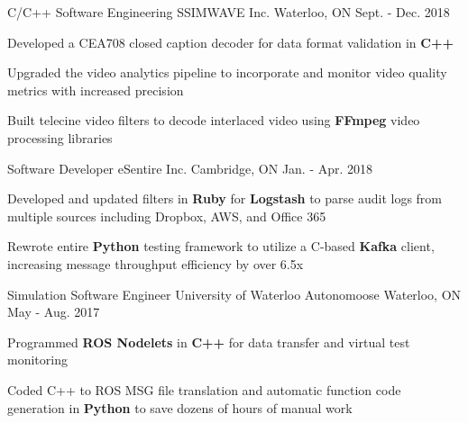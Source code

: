 \begin{cventries}

\cventry
{C/C++ Software Engineering} %
{SSIMWAVE Inc.} %
{Waterloo, ON} %
{Sept. - Dec. 2018} %
{ %
\begin{cvitems}
\item {Developed a CEA708 closed caption decoder for data format validation in {\bf C++}}
\item {Upgraded the video analytics pipeline to incorporate and monitor video quality metrics with increased precision}
\item {Built telecine video filters to decode interlaced video using {\bf FFmpeg} video processing libraries}
\end{cvitems}
}


\cventry
{Software Developer} %
{eSentire Inc.} %
{Cambridge, ON} %
{Jan. - Apr. 2018} %
{%
\begin{cvitems}
\item {Developed and updated filters in {\bf Ruby} for {\bf Logstash} to parse audit logs from multiple sources including Dropbox, AWS, and Office 365}
\item{Rewrote entire {\bf Python} testing framework to utilize a C-based {\bf Kafka} client, increasing message throughput efficiency by over 6.5x}
\end{cvitems}
}


\cventry
{Simulation Software Engineer} %
{University of Waterloo Autonomoose} %
{Waterloo, ON} %
{May - Aug. 2017} %
{%
\begin{cvitems}
\item {Programmed {\bf ROS Nodelets} in {\bf C++} for data transfer and virtual test monitoring}
\item {Coded C++ to ROS MSG file translation and automatic function code generation in {\bf Python} to save dozens of hours of manual work}
\end{cvitems}
}


\end{cventries}

